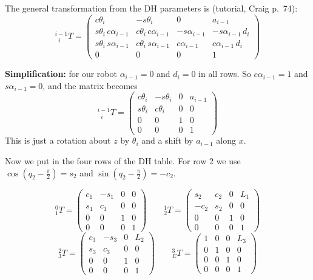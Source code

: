 \documentclass[11pt, a4paper]{article}
\begin{document}
The general transformation from the DH parameters is (tutorial, Craig p.~74):
\[
  {}^{i-1}_{\;\;i}T =
  \begin{pmatrix}
    c\theta_i & -s\theta_i & 0 & a_{i-1} \\
    s\theta_i\, c\alpha_{i-1} & c\theta_i\, c\alpha_{i-1} & -s\alpha_{i-1} & -s\alpha_{i-1}\, d_i \\
    s\theta_i\, s\alpha_{i-1} & c\theta_i\, s\alpha_{i-1} & c\alpha_{i-1} & c\alpha_{i-1}\, d_i \\
    0 & 0 & 0 & 1
  \end{pmatrix}
\]

\textbf{Simplification:} for our robot $\alpha_{i-1} = 0$ and $d_i = 0$ in all rows. So
$c\alpha_{i-1} = 1$ and $s\alpha_{i-1} = 0$, and the matrix becomes
\[
  {}^{i-1}_{\;\;i}T =
  \begin{pmatrix}
    c\theta_i & -s\theta_i & 0 & a_{i-1} \\
    s\theta_i & c\theta_i & 0 & 0 \\
    0 & 0 & 1 & 0 \\
    0 & 0 & 0 & 1
  \end{pmatrix}
\]
This is just a rotation about $z$ by $\theta_i$ and a shift by $a_{i-1}$ along $x$.

Now we put in the four rows of the DH table. For row 2 we use
$\cos(q_2 - \frac{\pi}{2}) = s_2$ and $\sin(q_2 - \frac{\pi}{2}) = -c_2$.

\[
  {}^0_1T =
  \begin{pmatrix} c_1 & -s_1 & 0 & 0 \\ s_1 & c_1 & 0 & 0 \\ 0 & 0 & 1 & 0 \\ 0 & 0 & 0 & 1 \end{pmatrix}
  \qquad
  {}^1_2T =
  \begin{pmatrix} s_2 & c_2 & 0 & L_1 \\ -c_2 & s_2 & 0 & 0 \\ 0 & 0 & 1 & 0 \\ 0 & 0 & 0 & 1 \end{pmatrix}
\]
\[
  {}^2_3T =
  \begin{pmatrix} c_3 & -s_3 & 0 & L_2 \\ s_3 & c_3 & 0 & 0 \\ 0 & 0 & 1 & 0 \\ 0 & 0 & 0 & 1 \end{pmatrix}
  \qquad
  {}^3_ET =
  \begin{pmatrix} 1 & 0 & 0 & L_3 \\ 0 & 1 & 0 & 0 \\ 0 & 0 & 1 & 0 \\ 0 & 0 & 0 & 1 \end{pmatrix}
\]
\end{document}
